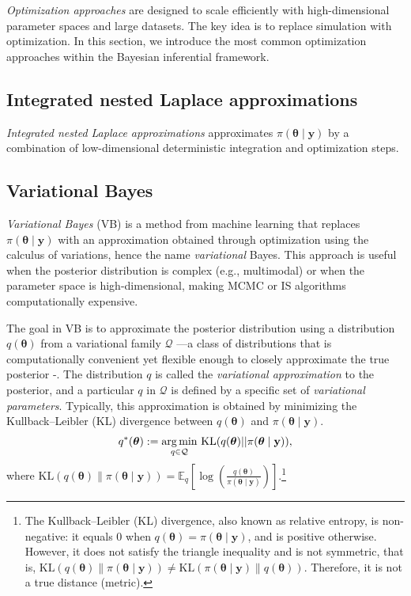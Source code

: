 \textit{Optimization approaches} are designed to scale efficiently with high-dimensional parameter spaces and large datasets. The key idea is to replace simulation with optimization. In this section, we introduce the most common optimization approaches within the Bayesian inferential framework. 

\subsection{Integrated nested Laplace approximations}\label{sec15_21}
\textit{Integrated nested Laplace approximations} approximates $\pi(\boldsymbol{\theta} \mid \mathbf{y})$ by a combination of low-dimensional deterministic integration and optimization steps. 

\subsection{Variational Bayes}\label{sec15_22}
\textit{Variational Bayes} (VB) is a method from machine learning \cite{jordan1999introduction, wainwright2008graphical} that replaces $\pi(\boldsymbol{\theta} \mid \mathbf{y})$ with an approximation obtained through optimization using the calculus of variations, hence the name \textit{variational} Bayes. This approach is useful when the posterior distribution is complex (e.g., multimodal) or when the parameter space is high-dimensional, making MCMC or IS algorithms computationally expensive.

The goal in VB is to approximate the posterior distribution using a distribution $q(\boldsymbol{\theta})$ from a variational family $\mathcal{Q}$ —a class of distributions that is computationally convenient yet flexible enough to closely approximate the true posterior \cite{blei2017variational}-. The distribution $q$ is called the \textit{variational approximation} to the posterior, and a particular $q$ in $\mathcal{Q}$ is defined by a specific set of \textit{variational parameters}. Typically, this approximation is obtained by minimizing the Kullback–Leibler (KL) divergence between $q(\boldsymbol{\theta})$ and $\pi(\boldsymbol{\theta} \mid \mathbf{y})$.
\begin{align}\label{eq:VB1}
	q^*(\boldsymbol{\theta}):=\underset{q \in \mathcal{Q}}{\argmin} \  \text{KL}(q(\boldsymbol{\theta})||\pi(\boldsymbol{\theta} \mid \mathbf{y})),
\end{align}  
where $\text{KL}(q(\boldsymbol{\theta}) \| \pi(\boldsymbol{\theta} \mid \mathbf{y})) = \mathbb{E}_q\left[\log\left(\frac{q(\boldsymbol{\theta})}{\pi(\boldsymbol{\theta} \mid \mathbf{y})}\right)\right]$.\footnote{The Kullback–Leibler (KL) divergence, also known as relative entropy, is non-negative: it equals 0 when $q(\boldsymbol{\theta}) = \pi(\boldsymbol{\theta} \mid \mathbf{y})$, and is positive otherwise. However, it does not satisfy the triangle inequality and is not symmetric, that is, $\text{KL}(q(\boldsymbol{\theta}) \| \pi(\boldsymbol{\theta} \mid \mathbf{y})) \neq \text{KL}(\pi(\boldsymbol{\theta} \mid \mathbf{y}) \| q(\boldsymbol{\theta}))$. Therefore, it is not a true distance (metric).}

